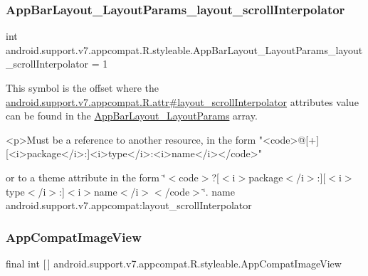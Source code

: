 \subsubsection{\texorpdfstring{App\+Bar\+Layout\+\_\+\+Layout\+Params\+\_\+layout\+\_\+scroll\+Interpolator}{AppBarLayout\_LayoutParams\_layout\_scrollInterpolator}}
{\footnotesize\ttfamily int android.\+support.\+v7.\+appcompat.\+R.\+styleable.\+App\+Bar\+Layout\+\_\+\+Layout\+Params\+\_\+layout\+\_\+scroll\+Interpolator = 1\hspace{0.3cm}{\ttfamily [static]}}

This symbol is the offset where the \hyperlink{classandroid_1_1support_1_1v7_1_1appcompat_1_1R_1_1attr_a0fd25d0e2274f4f31f8c486cb199e915}{android.\+support.\+v7.\+appcompat.\+R.\+attr\#layout\+\_\+scroll\+Interpolator} attribute\textquotesingle{}s value can be found in the \hyperlink{classandroid_1_1support_1_1v7_1_1appcompat_1_1R_1_1styleable_a4a7cc1057032876bdbbf3596c54747f4}{App\+Bar\+Layout\+\_\+\+Layout\+Params} array.

\begin{DoxyVerb}      <p>Must be a reference to another resource, in the form "<code>@[+][<i>package</i>:]<i>type</i>:<i>name</i></code>"
\end{DoxyVerb}
 or to a theme attribute in the form \char`\"{}$<$code$>$?\mbox{[}$<$i$>$package$<$/i$>$\+:\mbox{]}\mbox{[}$<$i$>$type$<$/i$>$\+:\mbox{]}$<$i$>$name$<$/i$>$$<$/code$>$\char`\"{}.  name android.\+support.\+v7.\+appcompat\+:layout\+\_\+scroll\+Interpolator \mbox{\label{classandroid_1_1support_1_1v7_1_1appcompat_1_1R_1_1styleable_a8d637497c66d3f24c82211c9ec73a3d9}} 
\subsubsection{\texorpdfstring{App\+Compat\+Image\+View}{AppCompatImageView}}
{\footnotesize\ttfamily final int \mbox{[}$\,$\mbox{]} android.\+support.\+v7.\+appcompat.\+R.\+styleable.\+App\+Compat\+Image\+View\hspace{0.3cm}{\ttfamily [static]}}

